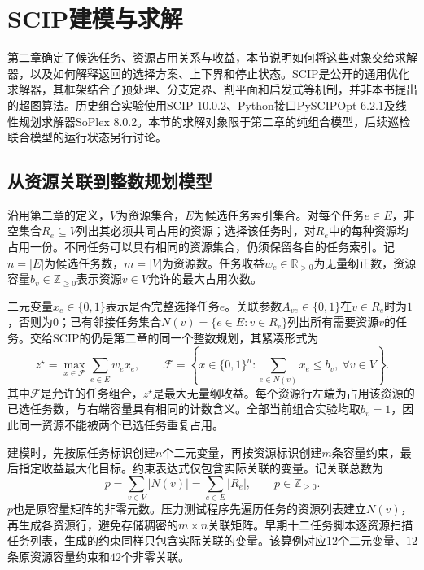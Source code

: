 \section{SCIP建模与求解}
\label{sec:03_01}

第二章确定了候选任务、资源占用关系与收益，本节说明如何将这些对象交给求解器，以及如何解释返回的选择方案、上下界和停止状态。SCIP是公开的通用优化求解器，其框架结合了预处理、分支定界、割平面和启发式等机制\cite{SCIP100}，并非本书提出的超图算法。历史组合实验使用SCIP 10.0.2、Python接口PySCIPOpt 6.2.1及线性规划求解器SoPlex 8.0.2。本节的求解对象限于第二章的纯组合模型，后续巡检联合模型的运行状态另行讨论。

\subsection{从资源关联到整数规划模型}

沿用第二章的定义，$V$为资源集合，$E$为候选任务索引集合。对每个任务$e\in E$，非空集合$R_e\subseteq V$列出其必须共同占用的资源；选择该任务时，对$R_e$中的每种资源均占用一份。不同任务可以具有相同的资源集合，仍须保留各自的任务索引。记$n=|E|$为候选任务数，$m=|V|$为资源数。任务收益$w_e\in\mathbb{R}_{>0}$为无量纲正数，资源容量$b_v\in\mathbb{Z}_{\geq0}$表示资源$v\in V$允许的最大占用次数。

二元变量$x_e\in\{0,1\}$表示是否完整选择任务$e$。关联参数$A_{ve}\in\{0,1\}$在$v\in R_e$时为$1$，否则为$0$；已有邻接任务集合$N(v)=\{e\in E:v\in R_e\}$列出所有需要资源$v$的任务。交给SCIP的仍是第二章的同一个整数规划，其紧凑形式为
\begin{equation}
 z^{\star}=\max_{x\in\mathcal{F}}\sum_{e\in E}w_ex_e,
 \qquad
 \mathcal{F}=\left\{x\in\{0,1\}^{n}:
 \sum_{e\in N(v)}x_e\leq b_v,
 \ \forall v\in V\right\}.
\label{s0301:submitted_model}
\end{equation}
其中$\mathcal{F}$是允许的任务组合，$z^{\star}$是最大无量纲收益。每个资源行左端为占用该资源的已选任务数，与右端容量具有相同的计数含义。全部当前组合实验均取$b_v=1$，因此同一资源不能被两个已选任务重复占用。

建模时，先按原任务标识创建$n$个二元变量，再按资源标识创建$m$条容量约束，最后指定收益最大化目标。约束表达式仅包含实际关联的变量。记关联总数为
\begin{equation}
 p=\sum_{v\in V}|N(v)|
   =\sum_{e\in E}|R_e|,
 \qquad p\in\mathbb{Z}_{\geq0}.
\label{s0301:incidence_count}
\end{equation}
$p$也是原容量矩阵的非零元数。压力测试程序先遍历任务的资源列表建立$N(v)$，再生成各资源行，避免存储稠密的$m\times n$关联矩阵。早期十二任务脚本逐资源扫描任务列表，生成的约束同样只包含实际关联的变量。该算例对应$12$个二元变量、$12$条原资源容量约束和$42$个非零关联。

